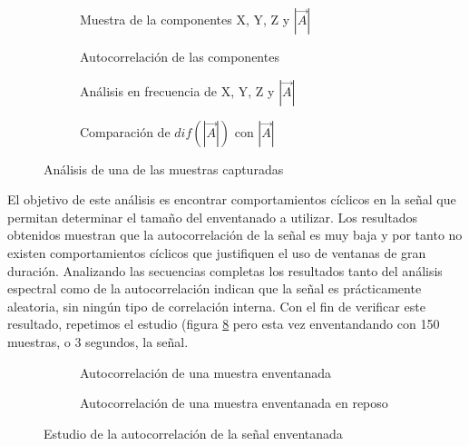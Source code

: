 \begin{figure}[htb!]
  \centering
  \begin{subfigure}[b]{0.48\textwidth}
      \centering
      \caption{Muestra de la componentes X, Y, Z y $|\vec{A}|$}
      \label{fig:dataset:xyzmodsample}
  \end{subfigure}
  \hfill
  \begin{subfigure}[b]{0.48\textwidth}
      \centering
      \caption{Autocorrelación de las componentes}
      \label{fig:dataset:autocorrsample}
  \end{subfigure}
  \begin{subfigure}[b]{0.48\textwidth}
    \centering
    \caption{Análisis en frecuencia de X, Y, Z y $|\vec{A}|$}
    \label{fig:dataset:fftsample} 
  \end{subfigure}
  \hfill
  \begin{subfigure}[b]{0.48\textwidth}
    \centering
    \caption{Comparación de $dif(|\vec{A}|)$ con $|\vec{A}|$}
    \label{fig:dataset:accelsample}
  \end{subfigure}
  \caption{\label{fig:dataset:samples} Análisis de una de las muestras capturadas}
\end{figure}

El objetivo de este análisis es encontrar comportamientos cíclicos en la señal que permitan determinar el tamaño del enventanado a utilizar. Los resultados obtenidos muestran que la autocorrelación de la señal es muy baja y por tanto no existen comportamientos cíclicos que justifiquen el uso de ventanas de gran duración. Analizando las secuencias completas los resultados tanto del análisis espectral como de la autocorrelación indican que la señal es prácticamente aleatoria, sin ningún tipo de correlación interna. Con el fin de verificar este resultado, repetimos el estudio (figura \ref{fig:dataset:sub:autocor} pero esta vez enventandando con 150 muestras, o 3 segundos, la señal.

\begin{figure}[htb!]
  \centering
  \begin{subfigure}[b]{0.48\textwidth}
      \centering
      \caption{Autocorrelación de una muestra enventanada}
      \label{fig:dataset:sub:autocorlow}
  \end{subfigure}
  \hfill
  \begin{subfigure}[b]{0.48\textwidth}
      \centering
      \caption{Autocorrelación de una muestra enventanada en reposo}
      \label{fig:dataset:sub:autocorhigh}
  \end{subfigure}
  \caption{\label{fig:dataset:sub:autocor} Estudio de la autocorrelación de la señal enventanada}

\end{figure}

